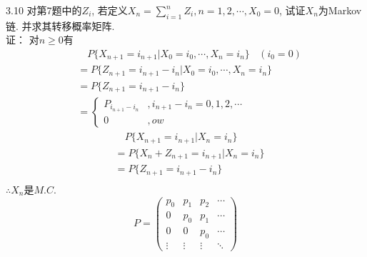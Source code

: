 3.10 对第7题中的$Z_i$, 若定义$X_n = \sum\limits^n_{i=1}Z_i, n = 1, 2, \cdots, X_0 = 0$, 试证$X_n$为Markov链. 并求其转移概率矩阵.\\
证：
对$n \geqslant 0$有\\
\[
\begin{split}
& \quad P\{X_{n+1} = i_{n+1} | X_0 = i_0, \cdots, X_n = i_n\}~~~~(i_0 = 0)\\
& = P\{Z_{n+1} = i_{n+1} - i_n | X_0 = i_0, \cdots, X_n = i_n\}\\
& = P\{Z_{n+1} = i_{n+1} - i_n\}\\
& =
\begin{cases}
P_{i_{n+1}-i_n} &, i_{n+1} - i_n = 0,1,2,\cdots\\
0 &, ow
\end{cases}
\end{split}
\]
\[
\begin{split}
& \quad P\{X_{n+1} = i_{n+1} | X_n = i_n\}\\
& = P\{X_{n} + Z_{n+1} = i_{n+1} | X_n = i_n\}\\
& = P\{Z_{n+1} = i_{n+1} - i_n\}\\
\end{split}
\]
$\therefore X_n $是$M.C.$\\
\[
P =
\begin{pmatrix}
p_0 & p_1 & p_2 & \cdots \\
0	& p_0 & p_1 & \cdots \\
0	& 0	  & p_0 & \cdots \\
\vdots & \vdots & \vdots & \ddots
\end{pmatrix}
\]


